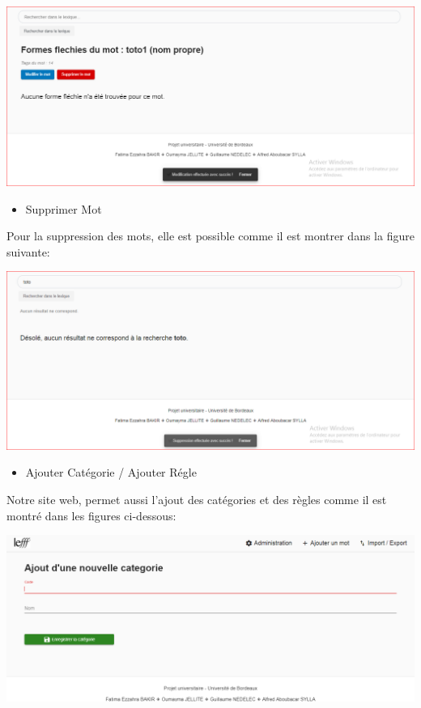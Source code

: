 \documentclass[12pt,a4paper]{article}
\begin{document}
\includegraphics[width=150mm]{img/ModificationEffectuer.PNG}


\begin{itemize}  
  \item Supprimer Mot
\end{itemize}
Pour la suppression des mots, elle est possible comme il est montrer dans la figure suivante:

\includegraphics[width=150mm]{img/SuppressionEffectuer.PNG}


\begin{itemize}  
  \item Ajouter Catégorie / Ajouter Régle 
\end{itemize}

Notre site web, permet aussi l'ajout des catégories et des règles comme il est montré dans les figures ci-dessous: 


 \includegraphics[width=150mm]{img/AjouterCat.PNG}
\end{document}
